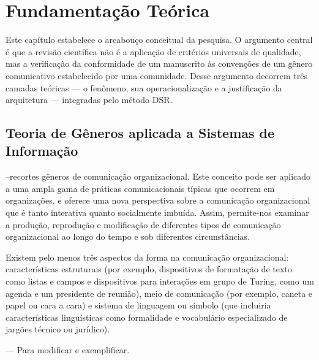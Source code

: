

\chapter{Fundamentação Teórica}\label{chap:fundamentacao}


Este capítulo estabelece o arcabouço conceitual da pesquisa. O argumento central é que a revisão científica não é a aplicação de critérios universais de qualidade, mas a verificação da conformidade de um manuscrito às convenções de um gênero comunicativo estabelecido por uma comunidade. Desse argumento decorrem três camadas teóricas — o fenômeno, sua operacionalização e a justificação da arquitetura — integradas pelo método DSR.

\section{Teoria de Gêneros aplicada a Sistemas de Informação}


--recortes
\cite{GenresOrgComm}
gêneros de comunicação organizacional. Este conceito pode ser aplicado a uma
ampla gama de práticas comunicacionais típicas que ocorrem em organizações, e
oferece uma nova perspectiva sobre a comunicação organizacional que é tanto
interativa quanto socialmente imbuída. Assim, permite-nos examinar a produção,
reprodução e modificação de diferentes tipos de comunicação organizacional ao longo
do tempo e sob diferentes circunstâncias.

\cite{GenresOrgComm}
Existem pelo menos três
aspectos da forma na comunicação organizacional: características estruturais (por exemplo,
dispositivos de formatação de texto como listas e campos e dispositivos para interações em
grupo de Turing, como um agenda e um presidente de reunião), meio de comunicação (por
exemplo, caneta e papel ou cara a cara) e sistema de linguagem ou símbolo (que incluiria
características linguísticas como formalidade e vocabulário especializado de jargões técnico
ou jurídico).

--- Para modificar e exemplificar. 


